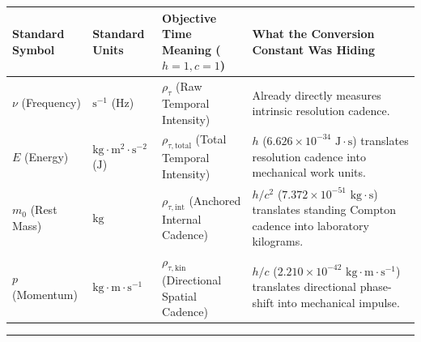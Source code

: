 \documentclass[
]{article}
\newcounter{none} %
\begin{document}
{\def\LTcaptype{none} %
\begin{longtable}[]{@{}
  >{\raggedright\arraybackslash}p{}
  >{\raggedright\arraybackslash}p{}
  >{\raggedright\arraybackslash}p{}
  >{\raggedright\arraybackslash}p{}@{}}
\toprule\noalign{}
\begin{minipage}[b]{\linewidth}\raggedright
Standard Symbol
\end{minipage} & \begin{minipage}[b]{\linewidth}\raggedright
Standard Units
\end{minipage} & \begin{minipage}[b]{\linewidth}\raggedright
Objective Time Meaning (\(h = 1, c = 1\))
\end{minipage} & \begin{minipage}[b]{\linewidth}\raggedright
What the Conversion Constant Was Hiding
\end{minipage} \\
\midrule\noalign{}
\endhead
\bottomrule\noalign{}
\endlastfoot
\textbf{\(\nu\)} (Frequency) & \(\text{s}^{-1}\) (\(\text{Hz}\)) &
\textbf{\(\rho_\tau\)} (Raw Temporal Intensity) & Already directly
measures intrinsic resolution cadence. \\
\textbf{\(E\)} (Energy) & \(\text{kg}\cdot\text{m}^2\cdot\text{s}^{-2}\)
(\(\text{J}\)) & \textbf{\(\rho_{\tau,\text{total}}\)} (Total Temporal
Intensity) & \textbf{\(h\)}
(\(6.626 \times 10^{-34}\text{ J}\cdot\text{s}\)) translates resolution
cadence into mechanical work units. \\
\textbf{\(m_0\)} (Rest Mass) & \(\text{kg}\) &
\textbf{\(\rho_{\tau,\text{int}}\)} (Anchored Internal Cadence) &
\textbf{\(h / c^2\)} (\(7.372 \times 10^{-51}\text{ kg}\cdot\text{s}\))
translates standing Compton cadence into laboratory kilograms. \\
\textbf{\(p\)} (Momentum) & \(\text{kg}\cdot\text{m}\cdot\text{s}^{-1}\)
& \textbf{\(\rho_{\tau,\text{kin}}\)} (Directional Spatial Cadence) &
\textbf{\(h / c\)}
(\(2.210 \times 10^{-42}\text{ kg}\cdot\text{m}\cdot\text{s}^{-1}\))
translates directional phase-shift into mechanical impulse. \\
\end{longtable}
}

\begin{center}\rule{0.5\linewidth}{0.5pt}\end{center}
\end{document}
